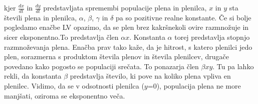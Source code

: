 \documentclass[11pt]{report}
\begin{document}
	kjer $\frac{dx}{dt}$ in $\frac{dy}{dt}$ predstavljata spremembi populacije plena in plenilca, $x$ in $y$ sta števili plena in plenilca,
	\vspace{5mm}
	$\alpha$, $\beta$, $\gamma$ in $\delta$ pa so pozitivne realne konstante.
	Če si bolje pogledamo enačbe LV opazimo, da se plen brez kakršnekoli ovire razmnožuje in sicer eksponentno.To predstavlja člen $\alpha x $. Konstanta $\alpha$ torej predstavlja stopnjo razmnoževanja plena. Enačba prav tako kaže, da je hitrost, s katero plenilci jedo plen, sorazmerna s produktom števila plenov in števila plenilcev, drugače povedano kako pogosto se populaciji srečata. To ponazarja člen $\beta x y $. Tu pa lahko rekli, da konstanta $\beta$ predstavlja število, ki pove na koliko plena vpliva en plenilec. Vidimo, da se v odsotnosti plenilca ($y$=0), populacija plena ne more manjšati, oziroma se eksponentno veča.
\end{document}
